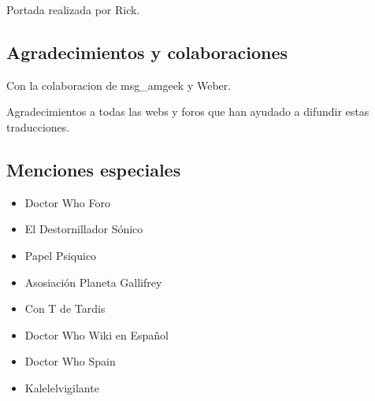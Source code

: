 Portada realizada por Rick.

\subsection*{Agradecimientos y
colaboraciones}\label{agradecimientos-y-colaboraciones}

Con la colaboracion de msg\_amgeek y Weber.

Agradecimientos a todas las webs y foros que han ayudado a difundir
estas traducciones.

\subsection*{Menciones especiales}\label{menciones-especiales}

\begin{itemize}
\itemsep1pt\parskip0pt
\item
  Doctor Who Foro
\item
  El Destornillador Sónico
\item
  Papel Psiquico
\item
  Asosiación Planeta Gallifrey
\item
  Con T de Tardis
\item
  Doctor Who Wiki en Español
\item
  Doctor Who Spain
\item
  Kalelelvigilante
\end{itemize}
